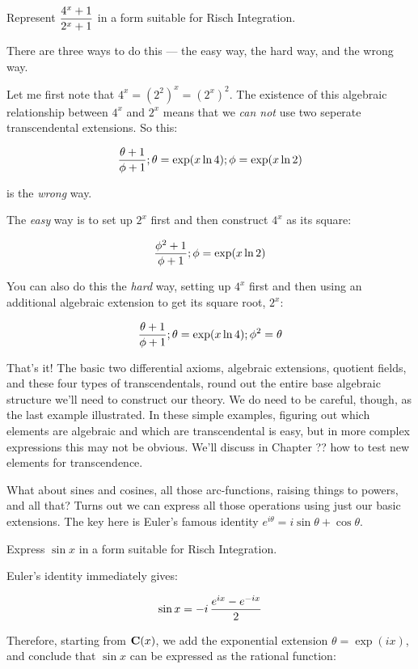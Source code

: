 \example Represent $\displaystyle {{4^x+1}\over{2^x+1}}$ in a form suitable for Risch Integration.

There are three ways to do this --- the easy way, the hard way, and the wrong way.

Let me first note that $4^x = (2^2)^x = (2^x)^2$.  The existence of
this algebraic relationship between $4^x$ and $2^x$ means that we {\it
can not} use two seperate transcendental extensions.  So this:

$${{\theta+1}\over{\phi+1}}; \theta = \exp(x \ln 4); \phi = \exp(x \ln 2)$$

is the {\it wrong} way.

The {\it easy} way is to set up $2^x$ first and then construct $4^x$
as its square:

$${{\phi^2+1}\over{\phi+1}}; \phi = \exp(x \ln 2)$$

You can also do this the {\it hard} way, setting up $4^x$ first and
then using an additional algebraic extension to get its square root,
$2^x$:

$${{\theta+1}\over{\phi+1}}; \theta = \exp(x \ln 4); \phi^2 = \theta$$

\endexample

That's it!  The basic two differential axioms, algebraic extensions,
quotient fields, and these four types of transcendentals, round out
the entire base algebraic structure we'll need to construct our
theory.  We do need to be careful, though, as the last example
illustrated.  In these simple examples, figuring out which elements
are algebraic and which are transcendental is easy, but in more
complex expressions this may not be obvious.  We'll discuss in Chapter
?? how to test new elements for transcendence.

What about sines and cosines, all those arc-functions, raising things
to powers, and all that?  Turns out we can express all those
operations using just our basic extensions.  The key here is Euler's
famous identity $e^{i\theta}=i\sin\theta+\cos\theta$.

\example

Express $\sin x$ in a form suitable for Risch Integration.

Euler's identity immediately gives:

$$\sin x = {-i \,{{e^{ix} - e^{-ix}}\over 2}}$$

Therefore, starting from ${\bf C}(x)$,
we add the exponential extension $\theta = \exp(ix)$,
and conclude that $\sin x$ can be expressed as the rational function:

